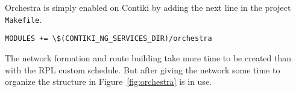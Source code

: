 Orchestra is simply enabled on Contiki by adding the next line in the project
\lstinline{Makefile}.

\begin{lstlisting}
MODULES += \$(CONTIKI_NG_SERVICES_DIR)/orchestra
\end{lstlisting}

The network formation and route building take more time to be created than with
the RPL custom schedule.
But after giving the network some time to organize the structure in
Figure~\ref{fig:orchestra} is in use.


